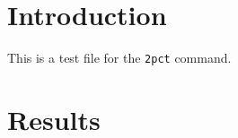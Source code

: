 

\newcommand{\TwoPctTitle}{\texttt{2pct} Example}
\newcommand{\TwoPctDate}{\today}
\newcommand{\TwoPctAuthor}{arjun}
\newcommand*{\plogo}{\fbox{$\mathcal{SEL}$} \smiley{}}
\newcommand{\TwoPctPublisher}{Some Economics Lab~~\plogo}



\clearpage

\section{Introduction}

This is a test file for the \texttt{2pct} command.

\section{Results}



